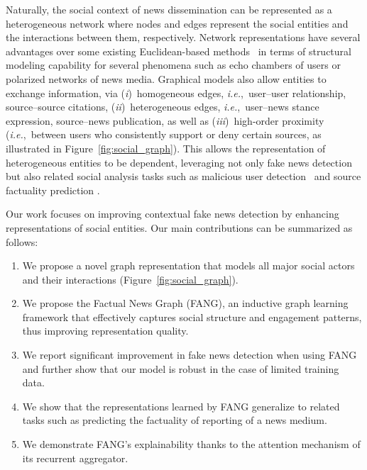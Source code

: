 \documentclass[sigconf]{acmart}
\theoremstyle{definition}
\theoremstyle{hypothesis}
\begin{document}
Naturally, the social context of news dissemination can be represented as a heterogeneous network 
where nodes and edges represent the social entities and the interactions between them, respectively. 
Network representations have several advantages over some existing Euclidean-based methods~\cite{ruchansky2017csi,liu2018early} in terms of structural modeling capability for several phenomena such as
echo chambers of users or polarized networks of news media. Graphical models also allow entities to exchange information, via (\emph{i})~homogeneous edges, \textit{i.e.},~user--user relationship, source--source citations, (\emph{ii})~heterogeneous edges, \textit{i.e.},~user--news stance expression, source--news publication, as well as (\emph{iii})~high-order proximity (\textit{i.e.},~between users who consistently support or deny certain sources, as illustrated in Figure~\ref{fig:social_graph}). This allows the representation of heterogeneous entities to be dependent, leveraging not only fake news detection but also related social analysis tasks such as malicious user detection~\cite{SeminarUsers2017} and source factuality prediction \cite{baly2018predicting}.


Our work focuses on improving contextual fake news detection by enhancing representations of social entities. Our main contributions can be summarized as follows:
\begin{enumerate}
    \item We propose a novel graph representation that models all major social actors and their interactions (Figure~\ref{fig:social_graph}). 
    \item We propose the Factual News Graph (FANG), an inductive graph learning framework that effectively captures social structure and engagement patterns, thus improving representation quality.
    \item We report significant improvement in fake news detection 
    when using FANG and further show that our model is robust in the case of limited training data.
    \item We show that the representations learned by FANG generalize to related tasks such as predicting the factuality of reporting of a news medium.
    \item We demonstrate FANG's explainability thanks to the attention mechanism of its recurrent aggregator.
\end{enumerate}
\end{document}
